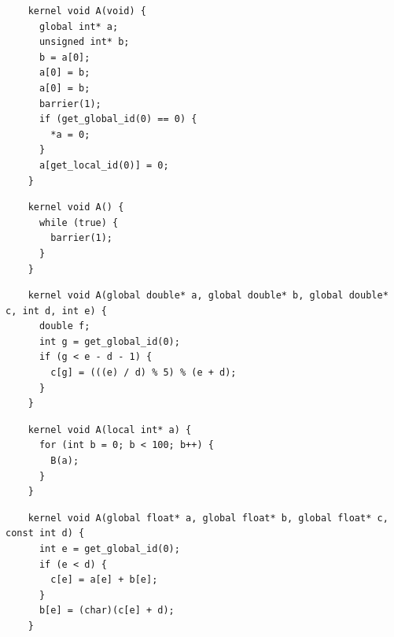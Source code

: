 \newsavebox{\XeonPhiSegfault}
\begin{lrbox}{\XeonPhiSegfault}
  \hspace{1.5em}
  \begin{lstlisting}
    kernel void A(void) {
      global int* a;
      unsigned int* b;
      b = a[0];
      a[0] = b;
      a[0] = b;
      barrier(1);
      if (get_global_id(0) == 0) {
        *a = 0;
      }
      a[get_local_id(0)] = 0;
    }
  \end{lstlisting}
\end{lrbox}

\newsavebox{\IntelVectorizerSegfault}
\begin{lrbox}{\IntelVectorizerSegfault}
  \hspace{1.5em}
  \begin{lstlisting}
    kernel void A() {
      while (true) {
        barrier(1);
      }
    }
  \end{lstlisting}
\end{lrbox}

\newsavebox{\IntelSizetIntUnreduced}
\begin{lrbox}{\IntelSizetIntUnreduced}
  \hspace{1.5em}
  \begin{lstlisting}
    kernel void A(global double* a, global double* b, global double* c, int d, int e) {
      double f;
      int g = get_global_id(0);
      if (g < e - d - 1) {
        c[g] = (((e) / d) % 5) % (e + d);
      }
    }
  \end{lstlisting}
\end{lrbox}

\newsavebox{\PoclUndefinedSymbols}
\begin{lrbox}{\PoclUndefinedSymbols}
  \hspace{1.5em}
  \begin{lstlisting}
    kernel void A(local int* a) {
      for (int b = 0; b < 100; b++) {
        B(a);
      }
    }
  \end{lstlisting}
\end{lrbox}


\newsavebox{\BeignetCastError}
\begin{lrbox}{\BeignetCastError}
  \hspace{1.5em}
  \begin{lstlisting}
    kernel void A(global float* a, global float* b, global float* c, const int d) {
      int e = get_global_id(0);
      if (e < d) {
        c[e] = a[e] + b[e];
      }
      b[e] = (char)(c[e] + d);
    }
  \end{lstlisting}
\end{lrbox}

